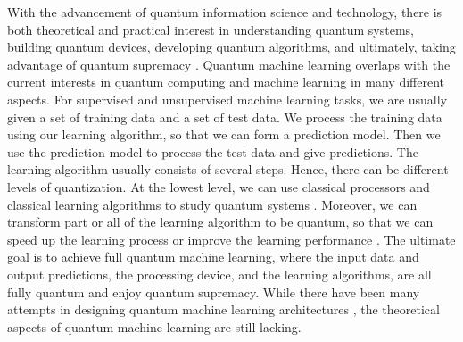 \documentclass[11pt]{article}
\theoremstyle{definition}
\begin{document}
With the advancement of quantum information science and technology, there is both theoretical and practical interest in understanding quantum systems, building quantum devices, developing quantum algorithms, and ultimately, taking advantage of quantum supremacy \cite{supremacy1,supremacy2}. Quantum machine learning overlaps with the current interests in quantum computing and machine learning in many different aspects. 
For supervised and unsupervised machine learning tasks, we are usually given a set of training data and a set of test data. We process the training data using our learning algorithm, so that we can form a prediction model. Then we use the prediction model to process the test data and give predictions. The learning algorithm usually consists of several steps. Hence, there can be different levels of quantization. At the lowest level, we can use classical processors and classical learning algorithms to study quantum systems \cite{MLtomo,manybody,phasematter,QMBstateDNN,MLPhaseTrans,MLTopoState,MLNNQST,MLdeepmatrices}. Moreover, we can transform part or all of the learning algorithm to be quantum, so that we can speed up the learning process or improve the learning performance \cite{lloyd2013quantum, quantumpca,huang2021information, KernelNature, KernelPRL}. The ultimate goal is to achieve full quantum machine learning, where the input data and output predictions, the processing device, and the learning algorithms, are all fully quantum and enjoy quantum supremacy. 
While there have been many attempts in designing quantum machine learning architectures \cite{deepqnn,cao2017quantum,wecker2016training,killoran2019continuous,arrazola2019machine,steinbrecher2019quantum}, the theoretical aspects of quantum machine learning are still lacking.
\end{document}

